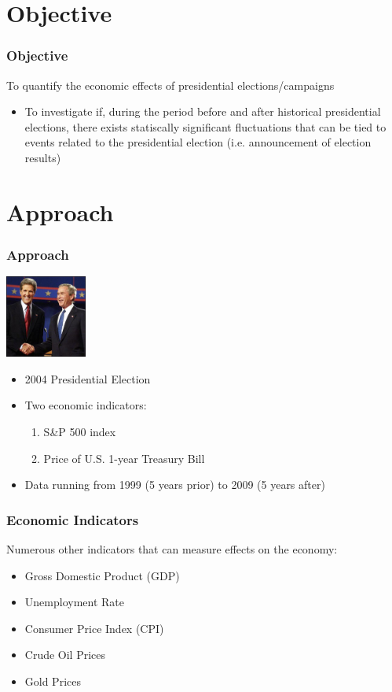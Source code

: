 \documentclass[compress,handout,10pt]{beamer}
\let\olditem\item
\renewcommand{\item}{\setlength{\itemsep}{0.5\baselineskip}\olditem}
\begin{document}
\section{Objective}
\begin{frame}
    \frametitle{Objective}
  {\large To quantify the economic effects of presidential elections/campaigns } 
\vspace{10pt}

\begin{itemize}
\item  To investigate if, during the period before and after historical presidential elections, there exists statiscally significant fluctuations that can be tied to events related to the presidential election (i.e. announcement of election results)
\end{itemize}
\end{frame}

\section{Approach}
\begin{frame}
    \frametitle{Approach}
\begin{center}
            \includegraphics[width=0.2\textwidth]{images/2004election.jpeg}
\end{center}
\begin{itemize}
\item  2004 Presidential Election 
\item Two economic indicators:
	\begin{enumerate}
		\item S\&P 500 index
		\item Price of U.S. 1-year Treasury Bill
	\end{enumerate}
\item Data running from 1999 (5 years prior) to 2009 (5 years after)
\end{itemize}
\end{frame}


\begin{frame}
    \frametitle{Economic Indicators}

Numerous other indicators that can measure effects on the economy:
\begin{itemize}
    \item Gross Domestic Product (GDP)
    \item Unemployment Rate
    \item Consumer Price Index (CPI)
    \item Crude Oil Prices
    \item Gold Prices
\end{itemize}

\end{frame}
\end{document}
